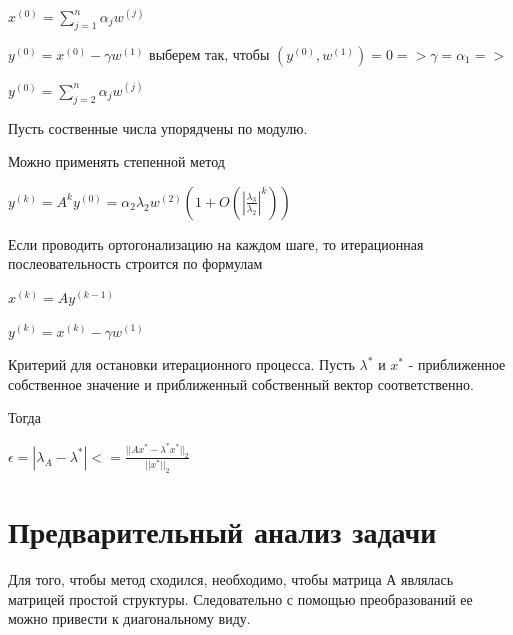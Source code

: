 \begin{math}
	x^{(0)}=\sum_{j=1}^{n}\alpha_{j}w^{(j)}
\end{math}

\begin{math}
  y^{(0)}= x^{(0)}-\gamma w^{(1)}
\end{math}
выберем так, чтобы
\begin{math}
   (y^{(0)},w^{(1)})=0 => \gamma=\alpha_{1} => 
\end{math}

\begin{math}
	y^{(0)}=\sum_{j=2}^{n}\alpha_{j}w^{(j)}
\end{math}

Пусть соственные числа упорядчены по модулю.

Можно применять степенной метод 

\begin{math}
	y^{(k)}=A^{k}y^{(0)}=\alpha_{2}\lambda_{2}w^{(2)} (1+O(|\frac{\lambda_{3}}{\lambda_{2}}|^{k}))
\end{math}

Если проводить ортогонализацию на каждом шаге, то итерационная послеовательность строится по формулам 

\begin{math}
  x^{(k)}=Ay^{(k-1)}
\end{math}

\begin{math}
	y^{(k)}=x^{(k)}-\gamma w^{(1)}
\end{math}

Критерий для остановки итерационного процесса. Пусть 
\begin{math}
	\lambda^{*}
\end{math}
и
\begin{math}
	x^{*}
\end{math}
- приближенное собственное значение и приближенный собственный вектор соответственно.

Тогда 

\begin{math}
	\epsilon=|\lambda_{A}-\lambda^{*}|<=\frac{||Ax^{*}-\lambda^{*}x^{*}||_{2}}{||x^{*}||_{2}}
\end{math}

\section{Предварительный анализ задачи}

Для того, чтобы метод сходился, необходимо, чтобы матрица А являлась матрицей простой структуры. Следовательно с помощью преобразований ее можно привести к диагональному виду. 

